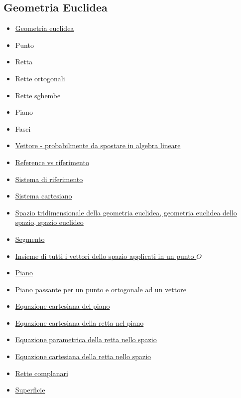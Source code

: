 \documentclass[a4paper,10pt]{article}
\begin{document}
\subsection*{Geometria Euclidea}
  \begin{itemize}   
   \item \href{./GeometriaEuclidea.pdf}{Geometria euclidea}	
   \item Punto
   \item Retta
   \item Rette ortogonali
   \item Rette sghembe
   \item Piano
   \item Fasci
   \item \href{./Vettore.pdf}{Vettore - probabilmente da spostare in algebra lineare}
   \item \href{./Reference.pdf}{Reference vs riferimento}
   \item \href{./SistemaRiferimento.pdf}{Sistema di riferimento}
   \item \href{./SistemaCartesiano.pdf}{Sistema cartesiano}   
   \item \href{./GeometriaEuclidea3d.pdf}{Spazio tridimensionale della geometria euclidea, geometria euclidea dello spazio, spazio euclideo}
   \item \href{./Segmento.pdf}{Segmento}
   \item \href{./InsiemeVettoriApplicati.pdf}{Insieme di tutti i vettori dello spazio applicati in un punto $O$}
   \item \href{./Piano.pdf}{Piano}
   \item \href{./PianoPassantePunto.pdf}{Piano passante per un punto e ortogonale ad un vettore}
   \item \href{./EquazioneCartesianaPiano.pdf}{Equazione cartesiana del piano}
   \item \href{./EquazioneCartesianaRettaPiano.pdf}{Equazione cartesiana della retta nel piano}
   \item \href{./EquazioneParametricaRettaSpazio.pdf}{Equazione parametrica della retta nello spazio}
   \item \href{./EquazioneCartesianaRetta.pdf}{Equazione cartesiana della retta nello spazio}
   \item \href{./RetteComplanari.pdf}{Rette complanari}
   \item \href{./Superficie.pdf}{Superficie}
  \end{itemize}
\end{document}

